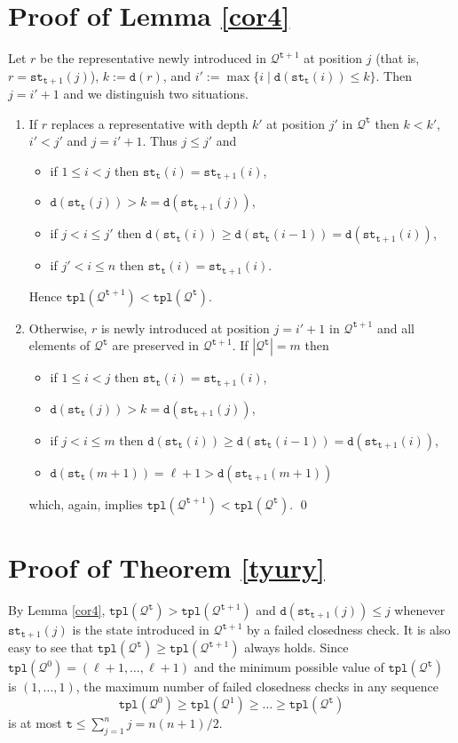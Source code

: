 \documentclass[preprint,12pt,english]{article}
\def\tpl{\mathtt{tpl}}
\def\tty{\mathtt{st}}
\def\cQ{\mathcal{Q}}
\def\depth{\mathtt{d}}
\def\ty{\mathtt{t}}
\begin{document}
\section{Proof of Lemma \ref{cor4}}
Let $r$ be the representative newly introduced  in $\cQ^{\ty+1}$ at position $j$ (that is, $r=\tty_{\ty+1}(j)$), $k:=\depth(r)$, and 
$i':=\max\{i\mid \depth(\tty_{\ty}(i))\leq k\}.$ Then $j=i'+1$ and we distinguish two situations.
\begin{enumerate}
\item If $r$ replaces a representative with depth $k'$ at position $j'$ in $\cQ^\ty$ then $k<k'$, $i'< j'$ and $j=i'+1$. Thus $j\leq j'$ and
\begin{itemize}
\item if $1\leq i<j$ then $\tty_{\ty}(i)=\tty_{\ty+1}(i)$, 
\item $\depth(\tty_\ty(j))>k=\depth(\tty_{\ty+1}(j))$, 
\item if $j<i\leq j'$ then $\depth(\tty_{\ty}(i))\geq\depth(\tty_\ty(i-1))=\depth(\tty_{\ty+1}(i))$, 
\item if $j'<i\leq n$ then $\tty_\ty(i)=\tty_{\ty+1}(i)$.
\end{itemize}
Hence $\tpl(\cQ^{\ty+1})<\tpl(\cQ^\ty).$
\item Otherwise, $r$ is newly introduced at position $j=i'+1$ in $\cQ^{\ty+1}$ and all elements of $\cQ^\ty$ are preserved in $\cQ^{\ty+1}$. If $|\cQ^\ty|=m$ then
\begin{itemize}
\item if $1\leq i< j$ then $\tty_{\ty}(i)=\tty_{\ty+1}(i)$, 
\item $\depth(\tty_\ty(j))>k=\depth(\tty_{\ty+1}(j))$, 
\item if $j<i\leq m$ then $\depth(\tty_{\ty}(i))\geq\depth(\tty_\ty(i-1))=\depth(\tty_{\ty+1}(i))$,
\item $\depth(\tty_\ty(m+1))=\ell+1>\depth(\tty_{\ty+1}(m+1))$
\end{itemize}
which, again, implies  $\tpl(\cQ^{\ty+1})<\tpl(\cQ^\ty).$ \qed
\end{enumerate}
\section{Proof of Theorem \ref{tyury}}
By Lemma \ref{cor4}, $\tpl(\cQ^{\ty})>\tpl(\cQ^{\ty+1})$ and $\depth(\tty_{\ty+1}(j))\leq j$ whenever $\tty_{\ty+1}(j)$ is the state introduced in $\cQ^{\ty+1}$ by a failed closedness check. It is also easy to see that $\tpl(\cQ^\ty)\geq\tpl(\cQ^{\ty+1})$ always holds. 
Since $\tpl(\cQ^0)=(\ell+1,\ldots,\ell+1)$ and the minimum possible value of $\tpl(\cQ^\ty)$ is $(1,\ldots,1)$,  the maximum number of failed closedness checks in any sequence 
$$\tpl(\cQ^0)\geq \tpl(\cQ^1)\geq \ldots \geq\tpl(\cQ^\ty)$$ is at most $\ty\leq \sum_{j=1}^n j=n (n+1)/2.$
\end{document}
